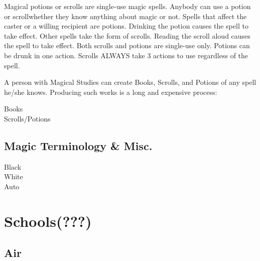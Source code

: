 \documentclass[twoside]{book}
\begin{document}
    {  
      Magical potions or scrolls are single-use magic
               spells. Anybody can use a potion or scrollwhether
               they know anything about magic or not. Spells that affect
               the caster or a willing recipient are potions. Drinking
               the potion causes the spell to take effect. Other spells
               take the form of scrolls. Reading the scroll aloud causes
               the spell to take effect. Both scrolls and potions are
               single-use only. Potions can be drunk in one action.
               Scrolls ALWAYS take 3 actions to use regardless of the
               spell. 
    }
  
    {  
      A person with Magical Studies can create Books,
               Scrolls, and Potions of any spell he/she knows. Producing
               such works is a long and expensive process: 
    }
  
\begin{description}
    
  \item[ Books ] 
  \item[ Scrolls/Potions ] 
\end{description}
  
    

\subsection{Magic Terminology \& Misc.}
    
\begin{description}
    
  \item[ Black ] 
  \item[ White ] 
  \item[ Auto ] 
\end{description}
  
    

\section{Schools(???)}
    
    

\subsection{Air}
    
\end{document}
